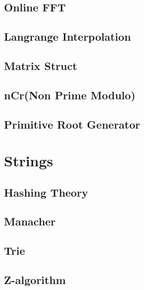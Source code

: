 \subsection{Online FFT}
\raggedbottom
\subsection{Langrange Interpolation}
\raggedbottom
\subsection{Matrix Struct}
\raggedbottom
\subsection{nCr(Non Prime Modulo)}
\raggedbottom
\subsection{Primitive Root Generator}
\raggedbottom

\section{Strings}
\subsection{Hashing Theory}
\raggedbottom
\subsection{Manacher}
\raggedbottom
\subsection{Trie}
\raggedbottom
\subsection{Z-algorithm}
\raggedbottom
